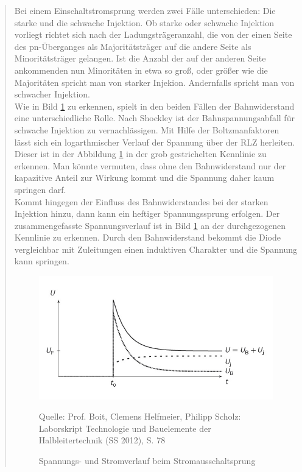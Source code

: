 \begin{quote}
	Bei einem Einschaltstromsprung werden zwei Fälle unterschieden: Die starke
	und die schwache Injektion. Ob starke oder schwache Injektion vorliegt
	richtet sich nach der Ladungsträgeranzahl, die von der einen Seite des
	pn-Überganges als Majoritätsträger auf die andere Seite als Minoritätsträger
	gelangen. Ist die Anzahl der auf der anderen Seite ankommenden nun
	Minoritäten in etwa so groß, oder größer wie die Majoritäten spricht man von
	starker Injekion. Andernfalls spricht man von schwacher Injektion.\\
    Wie in Bild \ref{fig:Stromeinschalten} zu erkennen, spielt in den beiden
    Fällen der Bahnwiderstand eine unterschiedliche Rolle. Nach Shockley ist der
    Bahnspannungsabfall für schwache Injektion zu vernachlässigen. Mit Hilfe der
    Boltzmanfaktoren lässt sich ein logarthmischer Verlauf der Spannung über der
    RLZ herleiten. Dieser ist in der Abbildung \ref{fig:Stromeinschalten} in der
    grob gestrichelten Kennlinie zu erkennen. Man könnte vermuten, dass ohne den
    Bahnwiderstand nur der kapazitive Anteil zur Wirkung kommt und die Spannung
	daher kaum springen darf.\\
	Kommt hingegen der Einfluss des Bahnwiderstandes bei der starken Injektion
	hinzu, dann kann ein heftiger Spannungssprung erfolgen. Der zusammengefasste 
	Spannungsverlauf ist in Bild \ref{fig:Stromeinschalten} an der 
	durchgezogenen Kennlinie zu erkennen. Durch den Bahnwiderstand bekommt die 
	Diode vergleichbar mit Zuleitungen einen induktiven Charakter und die 
	Spannung kann springen.

	\vspace{2em}
    
    \begin{figure}[H]
        \centering
        \includegraphics[scale=1]{./SchaltverhaltenBilder/Stromeinschalten.jpg}
        \caption{Spannungs- und Stromverlauf beim Stromausschaltsprung}
             \begin{center}
                 \small Quelle: Prof. Boit, Clemens Helfmeier, Philipp Scholz: Laborskript Technologie und Bauelemente der Halbleitertechnik (SS 2012), S. 78
             \end{center} 
        \label{fig:Stromeinschalten}
    \end{figure}
    

\end{quote}
